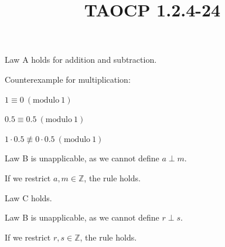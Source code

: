 \documentclass{article}
\title{TAOCP 1.2.4\mbox{-}24}
\begin{document}
\maketitle

Law A holds for addition and subtraction.

Counterexample for multiplication:

\( 1 \equiv 0\ (\mathrm{modulo}\ 1) \)

\( 0.5 \equiv 0.5\ (\mathrm{modulo}\ 1) \)

\( 1 \cdot 0.5 \not\equiv 0 \cdot 0.5\ (\mathrm{modulo}\ 1) \)

Law B is unapplicable, as we cannot define \( a \perp m \).

If we restrict \( a, m \in \mathbb{Z} \), the rule holds.

Law C holds.

Law B is unapplicable, as we cannot define \( r \perp s \).

If we restrict \( r, s \in \mathbb{Z} \), the rule holds.
\end{document}
